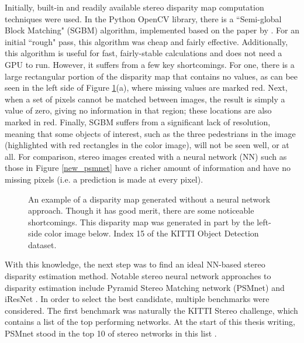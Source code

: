 Initially, built-in and readily available stereo disparity map computation techniques were used. In the Python OpenCV library, there is a ``Semi-global Block Matching" (SGBM) algorithm, implemented based on the paper by \cite{hirschmuller_stereo_2007}. For an initial ``rough" pass, this algorithm was cheap and fairly effective. Additionally, this algorithm is useful for fast, fairly-stable calculations and does not need a GPU to run. However, it suffers from a few key shortcomings. For one, there is a large rectangular portion of the disparity map that contains no values, as can bee seen in the left side of Figure \ref{ind15_SGBM_comparison}(a), where missing values are marked red. Next, when a set of pixels cannot be matched between images, the result is simply a value of zero, giving no information in that region; these locations are also marked in red. Finally, SGBM suffers from a significant lack of resolution, meaning that some objects of interest, such as the three pedestrians in the image (highlighted with red rectangles in the color image), will not be seen well, or at all. For comparison, stereo images created with a neural network (NN) such as those in Figure \ref{new_psmnet} have a richer amount of information and have no missing pixels (i.e. a prediction is made at every pixel).

\begin{figure}[H]
    \centering
    \caption{An example of a disparity map generated without a neural network approach. Though it has good merit, there are some noticeable shortcomings. This disparity map was generated in part by the left-side color image below. Index 15 of the KITTI Object Detection dataset.}
    \label{ind15_SGBM_comparison}
\end{figure}

With this knowledge, the next step was to find an ideal NN-based stereo disparity estimation method. Notable stereo neural network approaches to disparity estimation include Pyramid Stereo Matching network (PSMnet) \cite{chang_pyramid_2018} and iResNet \cite{liang_learning_2018}. In order to select the best candidate, multiple benchmarks were considered. The first benchmark was naturally the KITTI Stereo challenge, which contains a list of the top performing networks. At the start of this thesis writing, PSMnet stood in the top 10 of stereo networks in this list \cite{menze_kitti_2019}.

